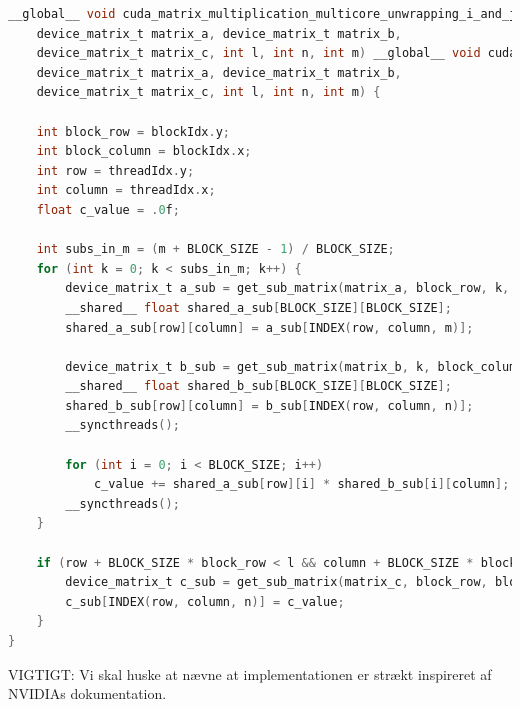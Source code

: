 \begin{lstlisting}[language=C, caption={Shared Memory Matrix Multiplication}, label={lst:matrix_multiplication_gpu_shared_memory}]
__global__ void cuda_matrix_multiplication_multicore_unwrapping_i_and_j_kernel(
    device_matrix_t matrix_a, device_matrix_t matrix_b,
    device_matrix_t matrix_c, int l, int n, int m) __global__ void cuda_matrix_multiplication_multi_core_shared_memory_kernel(
    device_matrix_t matrix_a, device_matrix_t matrix_b,
    device_matrix_t matrix_c, int l, int n, int m) {
    
    int block_row = blockIdx.y;
    int block_column = blockIdx.x;
    int row = threadIdx.y;
    int column = threadIdx.x;
    float c_value = .0f;

    int subs_in_m = (m + BLOCK_SIZE - 1) / BLOCK_SIZE;
    for (int k = 0; k < subs_in_m; k++) {
        device_matrix_t a_sub = get_sub_matrix(matrix_a, block_row, k, m);
        __shared__ float shared_a_sub[BLOCK_SIZE][BLOCK_SIZE];
        shared_a_sub[row][column] = a_sub[INDEX(row, column, m)];

        device_matrix_t b_sub = get_sub_matrix(matrix_b, k, block_column, n);
        __shared__ float shared_b_sub[BLOCK_SIZE][BLOCK_SIZE];
        shared_b_sub[row][column] = b_sub[INDEX(row, column, n)];
        __syncthreads();

        for (int i = 0; i < BLOCK_SIZE; i++) 
            c_value += shared_a_sub[row][i] * shared_b_sub[i][column];
        __syncthreads();
    }

    if (row + BLOCK_SIZE * block_row < l && column + BLOCK_SIZE * block_column  < n) {
        device_matrix_t c_sub = get_sub_matrix(matrix_c, block_row, block_column, n);
        c_sub[INDEX(row, column, n)] = c_value;
    } 
}
\end{lstlisting}

VIGTIGT: Vi skal huske at nævne at implementationen er strækt inspireret af NVIDIAs dokumentation.


